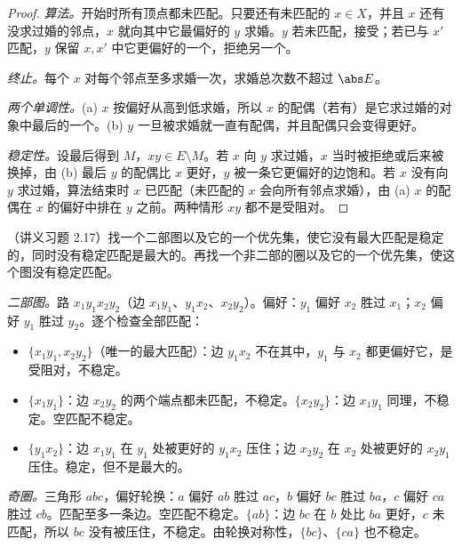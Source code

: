\begin{proof}
\emph{算法。}开始时所有顶点都未匹配。只要还有未匹配的 $x\in X$，并且 $x$ 还有没求过婚的邻点，$x$ 就向其中它最偏好的 $y$ 求婚。$y$ 若未匹配，接受；若已与 $x'$ 匹配，$y$ 保留 $x,x'$ 中它更偏好的一个，拒绝另一个。

\emph{终止。}每个 $x$ 对每个邻点至多求婚一次，求婚总次数不超过 $\abs E$。

\emph{两个单调性。}(a) $x$ 按偏好从高到低求婚，所以 $x$ 的配偶（若有）是它求过婚的对象中最后的一个。(b) $y$ 一旦被求婚就一直有配偶，并且配偶只会变得更好。

\emph{稳定性。}设最后得到 $M$，$xy\in E\setminus M$。若 $x$ 向 $y$ 求过婚，$x$ 当时被拒绝或后来被换掉，由 (b) 最后 $y$ 的配偶比 $x$ 更好，$y$ 被一条它更偏好的边饱和。若 $x$ 没有向 $y$ 求过婚，算法结束时 $x$ 已匹配（未匹配的 $x$ 会向所有邻点求婚），由 (a) $x$ 的配偶在 $x$ 的偏好中排在 $y$ 之前。两种情形 $xy$ 都不是受阻对。
\end{proof}

\begin{workedexample}\label{we:hall-condition:no-stable}
（讲义习题 2.17）找一个二部图以及它的一个优先集，使它没有最大匹配是稳定的，同时没有稳定匹配是最大的。再找一个非二部的圈以及它的一个优先集，使这个图没有稳定匹配。
\end{workedexample}
\begin{solution}
\emph{二部图。}路 $x_1y_1x_2y_2$（边 $x_1y_1$、$y_1x_2$、$x_2y_2$）。偏好：$y_1$ 偏好 $x_2$ 胜过 $x_1$；$x_2$ 偏好 $y_1$ 胜过 $y_2$。逐个检查全部匹配：
\begin{itemize}
\item $\{x_1y_1,x_2y_2\}$（唯一的最大匹配）：边 $y_1x_2$ 不在其中，$y_1$ 与 $x_2$ 都更偏好它，是受阻对，不稳定。
\item $\{x_1y_1\}$：边 $x_2y_2$ 的两个端点都未匹配，不稳定。$\{x_2y_2\}$：边 $x_1y_1$ 同理，不稳定。空匹配不稳定。
\item $\{y_1x_2\}$：边 $x_1y_1$ 在 $y_1$ 处被更好的 $y_1x_2$ 压住；边 $x_2y_2$ 在 $x_2$ 处被更好的 $x_2y_1$ 压住。稳定，但不是最大的。
\end{itemize}

\emph{奇圈。}三角形 $abc$，偏好轮换：$a$ 偏好 $ab$ 胜过 $ac$，$b$ 偏好 $bc$ 胜过 $ba$，$c$ 偏好 $ca$ 胜过 $cb$。匹配至多一条边。空匹配不稳定。$\{ab\}$：边 $bc$ 在 $b$ 处比 $ba$ 更好，$c$ 未匹配，所以 $bc$ 没有被压住，不稳定。由轮换对称性，$\{bc\}$、$\{ca\}$ 也不稳定。
\end{solution}


